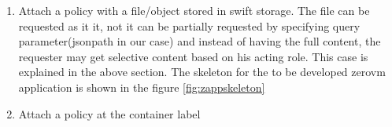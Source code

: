 \begin{enumerate}

  \item Attach a policy with a file/object stored in swift storage. The  file can be requested as it it, not it can be partially requested by specifying query parameter(jsonpath in our case) and instead of having the full content, the requester may get selective content based on his acting role. This case is explained in the above section. The skeleton for the to be developed zerovm application is shown in the figure \ref{fig:zappskeleton}





\item Attach a policy at the container label 

\end{enumerate}









